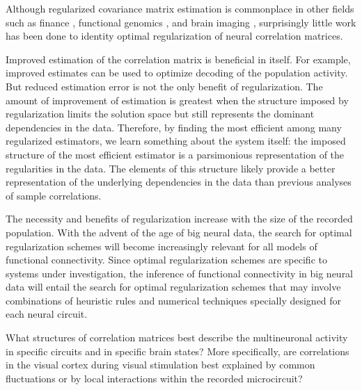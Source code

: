 \documentclass[10pt]{article}
\begin{document}
Although regularized covariance matrix estimation is commonplace in other fields such as finance \cite{Ledoit:2003}, functional genomics \cite{Schafer:2005}, and brain imaging \cite{Ryali:2012}, surprisingly little work has been done to identity optimal regularization of neural correlation matrices.  

Improved estimation of the correlation matrix is beneficial in itself. For example, improved estimates can be used to optimize  decoding of the population activity. But reduced estimation error is not the only benefit of regularization.  The amount of improvement of estimation is greatest when the structure imposed by regularization limits the solution space but still represents the dominant dependencies in the data. Therefore, by finding the most efficient among many regularized estimators, we learn something about the system itself: the imposed structure of the most efficient estimator is a parsimonious representation of the regularities in the data. The elements of this structure likely provide a better representation of the underlying dependencies in the data than previous analyses of sample correlations. 

The necessity and benefits of regularization increase with the size of the recorded population. With the advent of the age of big neural data, the search for optimal regularization schemes will become increasingly relevant for all models of functional connectivity. Since optimal regularization schemes are specific to systems under investigation, the inference of functional connectivity in big neural data will entail the search for optimal regularization schemes that may involve combinations of heuristic rules and numerical techniques specially designed for each neural circuit.

What structures of correlation matrices best describe the multineuronal activity in specific circuits and in specific brain states?  More specifically, are correlations in the visual cortex during visual stimulation best explained by common fluctuations or by local interactions within the recorded microcircuit? 
\end{document}
